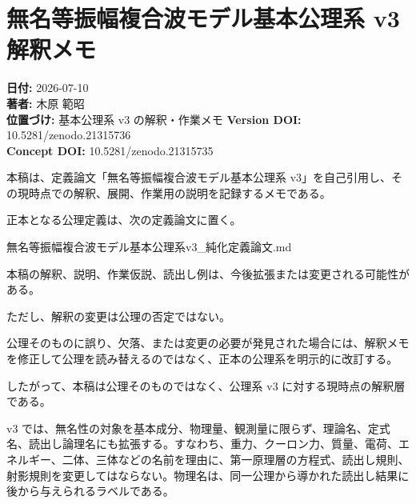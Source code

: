 \documentclass[
  a4paper]{ltjsarticle}
\author{}
\date{}
\newenvironment{Shaded}{}{}
\newcommand{\NormalTok}[1]{#1}
\begin{document}
\section{無名等振幅複合波モデル基本公理系 v3
解釈メモ}\label{ux7121ux540dux7b49ux632fux5e45ux8907ux5408ux6ce2ux30e2ux30c7ux30ebux57faux672cux516cux7406ux7cfb-v3-ux89e3ux91c8ux30e1ux30e2}

\textbf{日付:} 2026-07-10\\
\textbf{著者:} 木原 範昭\\
\textbf{位置づけ:} 基本公理系 v3 の解釈・作業メモ \textbf{Version DOI:}
10.5281/zenodo.21315736\\
\textbf{Concept DOI:} 10.5281/zenodo.21315735

本稿は、定義論文「無名等振幅複合波モデル基本公理系
v3」を自己引用し、その現時点での解釈、展開、作業用の説明を記録するメモである。

正本となる公理定義は、次の定義論文に置く。

\begin{Shaded}
\begin{Highlighting}[]
\NormalTok{無名等振幅複合波モデル基本公理系v3\_純化定義論文.md}
\end{Highlighting}
\end{Shaded}

本稿の解釈、説明、作業仮説、読出し例は、今後拡張または変更される可能性がある。

ただし、解釈の変更は公理の否定ではない。

公理そのものに誤り、欠落、または変更の必要が発見された場合には、解釈メモを修正して公理を読み替えるのではなく、正本の公理系を明示的に改訂する。

したがって、本稿は公理そのものではなく、公理系 v3
に対する現時点の解釈層である。

v3
では、無名性の対象を基本成分、物理量、観測量に限らず、理論名、定式名、読出し論理名にも拡張する。すなわち、重力、クーロン力、質量、電荷、エネルギー、二体、三体などの名前を理由に、第一原理層の方程式、読出し規則、射影規則を変更してはならない。物理名は、同一公理から導かれた読出し結果に後から与えられるラベルである。
\end{document}
